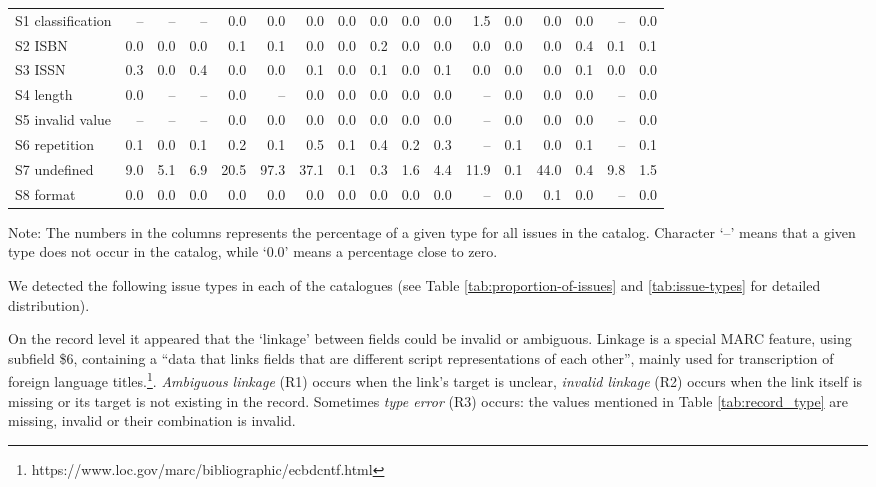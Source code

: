 \begin{table*}
\begin{minipage}{17.5cm}
\begin{center}
\begin{tabular}{lrrrrrrrrrrrrrrrr}
S1 classification & -- & -- & -- & 0.0 & 0.0 & 0.0 & 0.0 & 0.0 & 0.0 & 0.0 & 1.5 & 0.0 & 0.0 & 0.0 & -- & 0.0 \\
S2 ISBN & 0.0 & 0.0 & 0.0 & 0.1 & 0.1 & 0.0 & 0.0 & 0.2 & 0.0 & 0.0 & 0.0 & 0.0 & 0.0 & 0.4 & 0.1 & 0.1 \\
S3 ISSN & 0.3 & 0.0 & 0.4 & 0.0 & 0.0 & 0.1 & 0.0 & 0.1 & 0.0 & 0.1 & 0.0 & 0.0 & 0.0 & 0.1 & 0.0 & 0.0 \\
S4 length & 0.0 & -- & -- & 0.0 & -- & 0.0 & 0.0 & 0.0 & 0.0 & 0.0 & -- & 0.0 & 0.0 & 0.0 & -- & 0.0 \\
S5 invalid value & -- & -- & -- & 0.0 & 0.0 & 0.0 & 0.0 & 0.0 & 0.0 & 0.0 & -- & 0.0 & 0.0 & 0.0 & -- & 0.0 \\
S6 repetition & 0.1 & 0.0 & 0.1 & 0.2 & 0.1 & 0.5 & 0.1 & 0.4 & 0.2 & 0.3 & -- & 0.1 & 0.0 & 0.1 & -- & 0.1 \\
S7 undefined & 9.0 & 5.1 & 6.9 & 20.5 & 97.3 & 37.1 & 0.1 & 0.3 & 1.6 & 4.4 & 11.9 & 0.1 & 44.0 & 0.4 & 9.8 & 1.5 \\
S8 format & 0.0 & 0.0 & 0.0 & 0.0 & 0.0 & 0.0 & 0.0 & 0.0 & 0.0 & 0.0 & -- & 0.0 & 0.1 & 0.0 & -- & 0.0 \\
\bottomrule
\end{tabular}
\end{center}
\footnotesize
Note: The numbers in the columns represents the percentage of a given type for all issues in the catalog. Character `--' means that a given type does not occur in the catalog, while `0.0' means a percentage close to zero.
\end{minipage}
\end{table*}

We detected the following issue types in each of the catalogues (see Table \ref{tab:proportion-of-issues} and \ref{tab:issue-types} for detailed distribution).

On the record level it appeared that the `linkage' between fields could be invalid or ambiguous. Linkage is a special MARC feature, using subfield \$6, containing  a ``data that links fields that are different script representations of each other'', mainly used for transcription of foreign language titles.\footnote{https://www.loc.gov/marc/bibliographic/ecbdcntf.html}. \emph{Ambiguous linkage} (R1) occurs when the link's target is unclear, \emph{invalid linkage} (R2) occurs when the link itself is missing or its target is not existing in the record. Sometimes \emph{type error} (R3) occurs: the values mentioned in Table \ref{tab:record_type} are missing, invalid or their combination is invalid.

